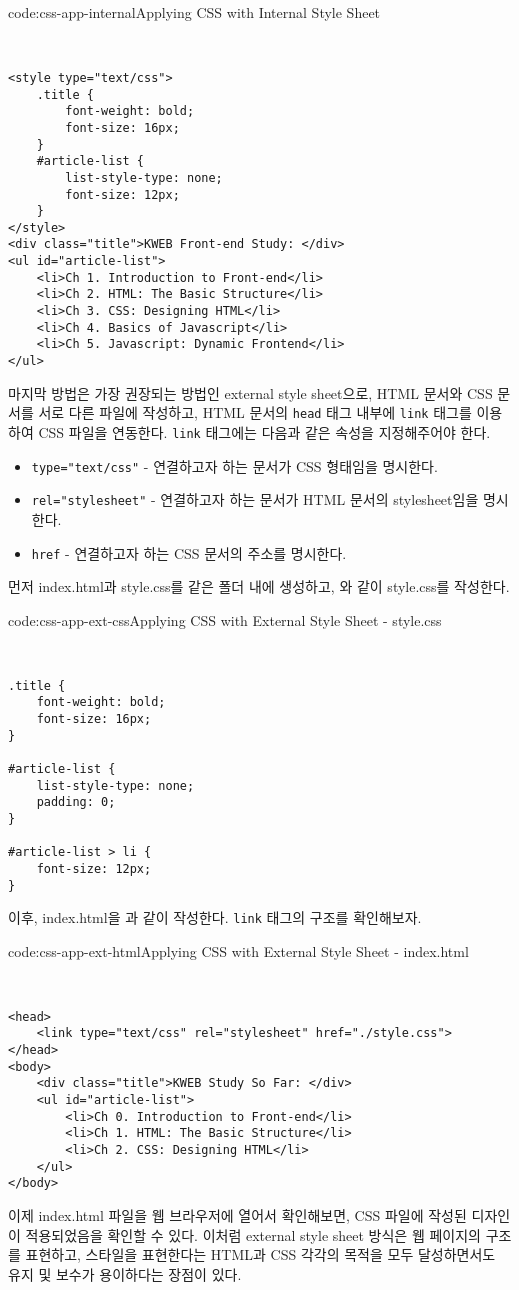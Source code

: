 \begin{codeenv}{code:css-app-internal}{Applying CSS with Internal Style Sheet}\begin{verbatim}


<style type="text/css">
    .title {
        font-weight: bold;
        font-size: 16px;
    }
    #article-list {
        list-style-type: none;
        font-size: 12px;
    }
</style>
<div class="title">KWEB Front-end Study: </div>
<ul id="article-list">
    <li>Ch 1. Introduction to Front-end</li>
    <li>Ch 2. HTML: The Basic Structure</li>
    <li>Ch 3. CSS: Designing HTML</li>
    <li>Ch 4. Basics of Javascript</li>
    <li>Ch 5. Javascript: Dynamic Frontend</li>
</ul>
\end{verbatim}
\end{codeenv}

마지막 방법은 가장 권장되는 방법인 external style sheet으로, HTML 문서와 CSS 문서를 서로 다른 파일에 작성하고, HTML 문서의 \texttt{head} 태그 내부에 \texttt{link} 태그를 이용하여 CSS 파일을 연동한다. \texttt{link} 태그에는 다음과 같은 속성을 지정해주어야 한다.

\begin{itemize}
    \item \texttt{type="text/css"} - 연결하고자 하는 문서가 CSS 형태임을 명시한다.
    \item \texttt{rel="stylesheet"} - 연결하고자 하는 문서가 HTML 문서의 stylesheet임을 명시한다.
    \item \texttt{href} - 연결하고자 하는 CSS 문서의 주소를 명시한다.
\end{itemize}

먼저 index.html과 style.css를 같은 폴더 내에 생성하고, 와 같이 style.css를 작성한다.

\begin{codeenv}{code:css-app-ext-css}{Applying CSS with External Style Sheet - style.css}\begin{verbatim}


.title {
    font-weight: bold;
    font-size: 16px;
}

#article-list {
    list-style-type: none;
    padding: 0;
}

#article-list > li {
    font-size: 12px;
}
\end{verbatim}
\end{codeenv}

이후, index.html을 과 같이 작성한다. \texttt{link} 태그의 구조를 확인해보자.

\begin{codeenv}{code:css-app-ext-html}{Applying CSS with External Style Sheet - index.html}\begin{verbatim}


<head>
    <link type="text/css" rel="stylesheet" href="./style.css">
</head>
<body>
    <div class="title">KWEB Study So Far: </div>
    <ul id="article-list">
        <li>Ch 0. Introduction to Front-end</li>
        <li>Ch 1. HTML: The Basic Structure</li>
        <li>Ch 2. CSS: Designing HTML</li>
    </ul>
</body>
\end{verbatim}
\end{codeenv}

이제 index.html 파일을 웹 브라우저에 열어서 확인해보면, CSS 파일에 작성된 디자인이 적용되었음을 확인할 수 있다. 이처럼 external style sheet 방식은 웹 페이지의 구조를 표현하고, 스타일을 표현한다는 HTML과 CSS 각각의 목적을 모두 달성하면서도 유지 및 보수가 용이하다는 장점이 있다. 
